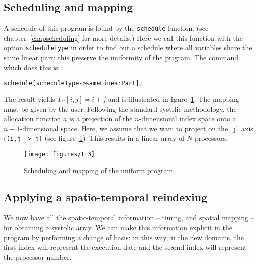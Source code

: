 \subsection{Scheduling and mapping}
\label{schedAlpha}

A schedule of this program is found by the {\tt schedule} function.  
(see chapter~\ref{chapscheduling} for more details.) 
Here we call this function with the option
{\tt scheduleType} in order to find out
a schedule where 
all variables share the same linear part: this
preserve the uniformity of the program. 
The {\mmalfa} command which does this is: 
\begin{verbatim}
schedule[scheduleType->sameLinearPart];
\end{verbatim}
The result yields $T_C[i,j] = i+j$ and is illustrated in
figure~\ref{figder4}. The mapping must be given by the
user. Following the standard systolic methodology, the 
allocation
function $a$ is a projection of the $n$-dimensional index space onto a
$n-1$-dimensional space. Here, we assume that we want to  project on the
$\vec{\jmath}$ axis ({\tt (i,j -> j)} (see figure~\ref{figder4}). This results
in a linear array of $N$ processors.
 
\begin{figure}[htbp]
\centerline{\texttt{[image: figures/tr3]}}
\caption{Scheduling and mapping of the uniform program}
\label{figder4}
\end{figure}


\subsection{Applying a spatio-temporal reindexing}
We now have all the spatio-temporal information -- timing, and spatial
mapping -- for obtaining a systolic array.  We can make this
information explicit in the {\alfa} program by performing a change of basis: 
in this way, in the new domains, the first index will represent the
execution date and the second index will represent the processor
number. 


